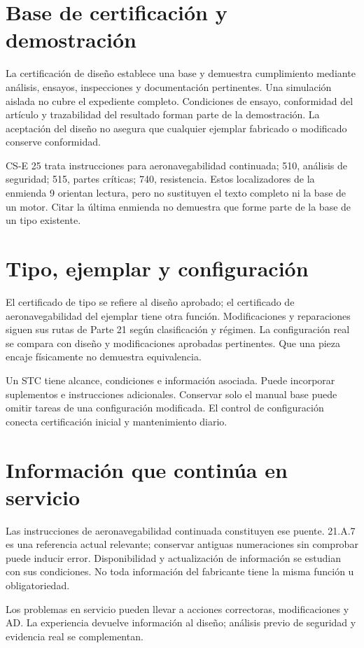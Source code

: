
\section{Base de certificación y demostración}
La certificación de diseño establece una base y demuestra cumplimiento mediante análisis, ensayos, inspecciones y documentación pertinentes. Una simulación aislada no cubre el expediente completo. Condiciones de ensayo, conformidad del artículo y trazabilidad del resultado forman parte de la demostración. La aceptación del diseño no asegura que cualquier ejemplar fabricado o modificado conserve conformidad.

CS-E 25 trata instrucciones para aeronavegabilidad continuada; 510, análisis de seguridad; 515, partes críticas; 740, resistencia. Estos localizadores de la enmienda 9 orientan lectura, pero no sustituyen el texto completo ni la base de un motor. Citar la última enmienda no demuestra que forme parte de la base de un tipo existente.
\section{Tipo, ejemplar y configuración}
El certificado de tipo se refiere al diseño aprobado; el certificado de aeronavegabilidad del ejemplar tiene otra función. Modificaciones y reparaciones siguen sus rutas de Parte 21 según clasificación y régimen. La configuración real se compara con diseño y modificaciones aprobadas pertinentes. Que una pieza encaje físicamente no demuestra equivalencia.

Un STC tiene alcance, condiciones e información asociada. Puede incorporar suplementos e instrucciones adicionales. Conservar solo el manual base puede omitir tareas de una configuración modificada. El control de configuración conecta certificación inicial y mantenimiento diario.
\section{Información que continúa en servicio}
Las instrucciones de aeronavegabilidad continuada constituyen ese puente. 21.A.7 es una referencia actual relevante; conservar antiguas numeraciones sin comprobar puede inducir error. Disponibilidad y actualización de información se estudian con sus condiciones. No toda información del fabricante tiene la misma función u obligatoriedad.

Los problemas en servicio pueden llevar a acciones correctoras, modificaciones y AD. La experiencia devuelve información al diseño; análisis previo de seguridad y evidencia real se complementan.
